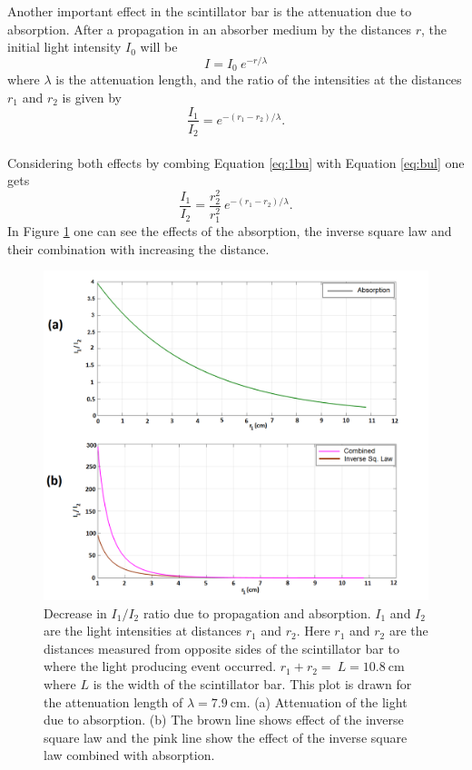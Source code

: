 \documentclass[a4paper]{article}\linespread{1.4}
\begin{document}
Another important effect in the scintillator bar is the attenuation due to absorption. After a propagation in an absorber medium by the distances $r$, the initial light intensity $I_{0}$ will be 
\begin{equation}I = I_{0} \ e^{-r/\lambda} \end{equation} 
where $\lambda$ is the attenuation length,
and the ratio of the intensities at the distances $r_{1}$ and $r_{2}$ is given by
\begin{equation} \frac{I_{1}}{I_{2}} = e^{-(r_{1}-r_{2})/\lambda} .\label{eq:bul}\end{equation}
\\Considering both effects by combing Equation \ref{eq:1bu} with Equation \ref{eq:bul}
one gets
\begin{equation} \frac{I_{1}}{I_{2}} =   \frac{r_{2}^{2}}{r_{1}^{2}} \ e^{-(r_{1}-r_{2})/\lambda} .\label{eq:4}\end{equation}
In Figure \ref{fig:gull} one can see the effects of the absorption, the inverse square law and their combination with increasing the distance. 
\begin{figure}[h!] 
	\hspace*{0cm} 
	\includegraphics[width=120mm,scale=2.0]{figures/1t.png} 
	\caption{%
	Decrease in $I_{1} / I_{2}$ ratio due to propagation and absorption. $I_{1}$ and  $I_{2}$ are the light intensities at distances  $r_{1}$ and  $r_{2}$. Here $r_{1}$ and $r_{2}$ are the distances measured from opposite sides of the scintillator bar to where the light producing event occurred. $r_{1}+ r_{2}= \ L = 10.8~\mathrm{cm}$ where $L$ is the width of the scintillator bar. This plot is drawn for the attenuation length of $\lambda=7.9~\mathrm{cm}$.  (a) Attenuation of the light due to absorption. (b) The brown line shows effect of the inverse square law and the pink line show the effect of the inverse square law combined with absorption. %
	}
	\label{fig:gull}
\end{figure}
\end{document}
